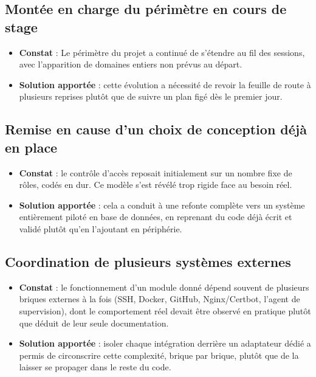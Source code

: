 \subsection{Montée en charge du périmètre en cours de stage}

\begin{itemize}
  \item \textbf{Constat} : Le périmètre du projet a continué
        de s'étendre au fil des sessions, avec l'apparition de domaines
        entiers non prévus au départ.
  \item \textbf{Solution apportée} : cette évolution a nécessité de
        revoir la feuille de route à plusieurs reprises plutôt que de
        suivre un plan figé dès le premier jour.
\end{itemize}

\subsection{Remise en cause d'un choix de conception déjà en place}

\begin{itemize}
  \item \textbf{Constat} : le contrôle d'accès reposait initialement sur
        un nombre fixe de rôles, codés en dur. Ce modèle s'est révélé
        trop rigide face au besoin réel.
  \item \textbf{Solution apportée} : cela a conduit à une refonte
        complète vers un système entièrement piloté en base de données,
        en reprenant du code déjà écrit et validé plutôt qu'en
        l'ajoutant en périphérie.
\end{itemize}

\subsection{Coordination de plusieurs systèmes externes}

\begin{itemize}
  \item \textbf{Constat} : le fonctionnement d'un module donné dépend
        souvent de plusieurs briques externes à la fois (SSH, Docker,
        GitHub, Nginx/Certbot, l'agent de supervision), dont le
        comportement réel devait être observé en pratique plutôt que
        déduit de leur seule documentation.
  \item \textbf{Solution apportée} : isoler chaque intégration derrière
        un adaptateur dédié a permis de circonscrire cette complexité,
        brique par brique, plutôt que de la laisser se propager dans le
        reste du code.
\end{itemize}
